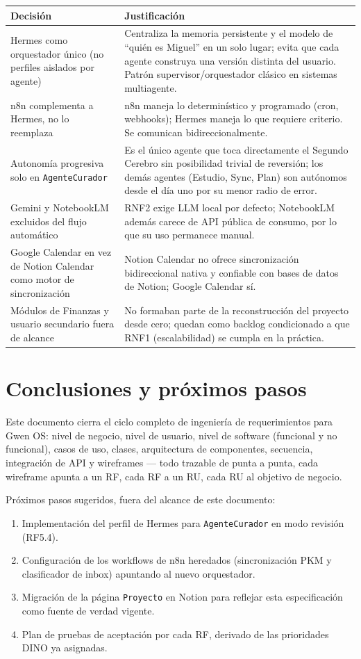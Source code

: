 \documentclass[11pt,a4paper]{article}
\begin{document}
\begin{longtable}{@{}p{3.2cm}p{10.3cm}@{}}
\toprule
Decisión & Justificación \\
\midrule
\endhead
Hermes como orquestador único (no perfiles aislados por agente) & Centraliza la memoria persistente y el modelo de ``quién es Miguel'' en un solo lugar; evita que cada agente construya una versión distinta del usuario. Patrón supervisor/orquestador clásico en sistemas multiagente. \\
n8n complementa a Hermes, no lo reemplaza & n8n maneja lo determinístico y programado (cron, webhooks); Hermes maneja lo que requiere criterio. Se comunican bidireccionalmente. \\
Autonomía progresiva solo en \texttt{AgenteCurador} & Es el único agente que toca directamente el Segundo Cerebro sin posibilidad trivial de reversión; los demás agentes (Estudio, Sync, Plan) son autónomos desde el día uno por su menor radio de error. \\
Gemini y NotebookLM excluidos del flujo automático & RNF2 exige LLM local por defecto; NotebookLM además carece de API pública de consumo, por lo que su uso permanece manual. \\
Google Calendar en vez de Notion Calendar como motor de sincronización & Notion Calendar no ofrece sincronización bidireccional nativa y confiable con bases de datos de Notion; Google Calendar sí. \\
Módulos de Finanzas y usuario secundario fuera de alcance & No formaban parte de la reconstrucción del proyecto desde cero; quedan como backlog condicionado a que RNF1 (escalabilidad) se cumpla en la práctica. \\
\bottomrule
\end{longtable}

\section{Conclusiones y próximos pasos}

Este documento cierra el ciclo completo de ingeniería de requerimientos para Gwen OS: nivel de negocio, nivel de usuario, nivel de software (funcional y no funcional), casos de uso, clases, arquitectura de componentes, secuencia, integración de API y wireframes --- todo trazable de punta a punta, cada wireframe apunta a un RF, cada RF a un RU, cada RU al objetivo de negocio.

Próximos pasos sugeridos, fuera del alcance de este documento:
\begin{enumerate}[leftmargin=1.2cm]
  \item Implementación del perfil de Hermes para \texttt{AgenteCurador} en modo revisión (RF5.4).
  \item Configuración de los workflows de n8n heredados (sincronización PKM y clasificador de inbox) apuntando al nuevo orquestador.
  \item Migración de la página \texttt{Proyecto} en Notion para reflejar esta especificación como fuente de verdad vigente.
  \item Plan de pruebas de aceptación por cada RF, derivado de las prioridades DINO ya asignadas.
\end{enumerate}
\end{document}
